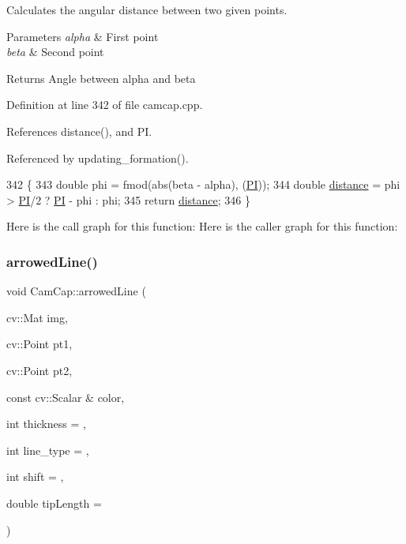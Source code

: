 Calculates the angular distance between two given points. 


\begin{DoxyParams}{Parameters}
{\em alpha} & First point \\
\hline
{\em beta} & Second point \\
\hline
\end{DoxyParams}
\begin{DoxyReturn}{Returns}
Angle between alpha and beta 
\end{DoxyReturn}


Definition at line 342 of file camcap.\+cpp.



References distance(), and PI.



Referenced by updating\+\_\+formation().


\begin{DoxyCode}
342                                                          \{
343     \textcolor{keywordtype}{double} phi = fmod(abs(beta - alpha), (\hyperlink{camcap_8hpp_a598a3330b3c21701223ee0ca14316eca}{PI}));
344     \textcolor{keywordtype}{double} \hyperlink{class_cam_cap_a6595a726e77091a8accf19e62dc55e41}{distance} = phi > \hyperlink{camcap_8hpp_a598a3330b3c21701223ee0ca14316eca}{PI}/2 ? \hyperlink{camcap_8hpp_a598a3330b3c21701223ee0ca14316eca}{PI} - phi : phi;
345     \textcolor{keywordflow}{return} \hyperlink{class_cam_cap_a6595a726e77091a8accf19e62dc55e41}{distance};
346 \}
\end{DoxyCode}
Here is the call graph for this function\+:
Here is the caller graph for this function\+:
\mbox{\label{class_cam_cap_afb044a7b5b3b2f17af62e3115e84993e}} 
\subsubsection{\texorpdfstring{arrowed\+Line()}{arrowedLine()}}
{\footnotesize\ttfamily void Cam\+Cap\+::arrowed\+Line (\begin{DoxyParamCaption}\item[{cv\+::\+Mat}]{img,  }\item[{cv\+::\+Point}]{pt1,  }\item[{cv\+::\+Point}]{pt2,  }\item[{const cv\+::\+Scalar \&}]{color,  }\item[{int}]{thickness = {},  }\item[{int}]{line\+\_\+type = {},  }\item[{int}]{shift = {},  }\item[{double}]{tip\+Length = {} }\end{DoxyParamCaption})}



